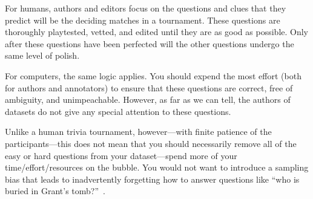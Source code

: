 For humans, authors and editors focus on the questions and clues that they predict will be the deciding matches in a tournament.
These questions are thoroughly playtested, vetted, and edited until they are as good as possible.
Only after these questions have been perfected will the other questions undergo the same level of polish.

For computers, the same logic applies.  
You should expend the most effort (both for authors and annotators) to ensure that these questions are correct, free of ambiguity, and unimpeachable.
However, as far as we can tell, the authors of \qa{} datasets do not give any special attention to these questions.

Unlike a human trivia tournament, however---with finite patience of the participants---this does not mean that you should necessarily remove all of the easy or hard questions from your dataset---spend more of your time/effort/resources on the bubble.
You would not want to introduce a sampling bias that leads to inadvertently forgetting how to answer questions like ``who is buried in Grant's tomb?''~\cite[Chapter 7]{dwan-00}.